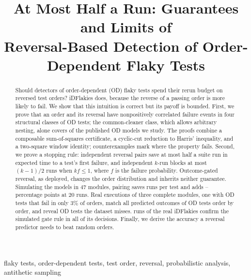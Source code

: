 \documentclass[conference,letterpaper]{IEEEtran}
\theoremstyle{definition}
\begin{document}
\title{At Most Half a Run: Guarantees and Limits of\\Reversal-Based Detection of Order-Dependent Flaky Tests}

\author{
}

\maketitle

\begin{abstract}
Should detectors of order-dependent (OD) flaky tests spend their rerun budget on reversed test orders? iDFlakies does, because the reverse of a passing order is more likely to fail. We show that this intuition is correct but its payoff is bounded. First, we prove that an order and its reversal have nonpositively correlated failure events in four structural classes of OD tests; the common-cleaner class, which allows arbitrary nesting, alone covers \CovThmOne{} of the \NTargets{} published OD models we study. The proofs combine a composable sum-of-squares certificate, a cyclic-cut reduction to Harris' inequality, and a two-square window identity; counterexamples mark where the property fails. Second, we prove a stopping rule: independent reversal pairs save at most half a suite run in expected time to a test's first failure, and independent $k$-run blocks at most $(k-1)/2$ runs when $kf\le1$, where $f$ is the failure probability. Outcome-gated reversal, as deployed, changes the order distribution and inherits neither guarantee. Simulating the \NTargets{} models in 47 modules, pairing saves \KRSaveMean{} runs per test and adds \nosign\KRPairMinusIidTwenty--\nosign\NRPairMinusIidTwenty{} percentage points at 20 runs. Real executions of three complete modules, one with OD tests that fail in only 3\% of orders, match all \ExecAllComparisons{} predicted outcomes of \ExecAllTargets{} OD tests order by order, and reveal OD tests the dataset misses. \IdfDetectorRuns{} runs of the real iDFlakies confirm the simulated gate rule in all \IdfGateTransitions{} of its decisions. Finally, we derive the accuracy a reversal predictor needs to beat random orders.
\end{abstract}

\begin{IEEEkeywords}
flaky tests, order-dependent tests, test order, reversal, probabilistic analysis, antithetic sampling
\end{IEEEkeywords}
\end{document}
